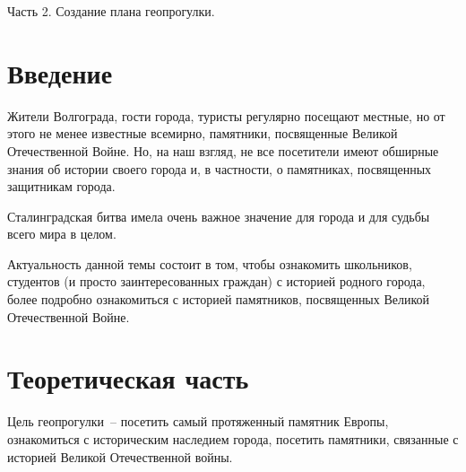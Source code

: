 \newcommand{\eX}{\stepcounter{theX}X\arabic{theX}}

\begin{center}
  \large Часть 2. Создание плана геопрогулки.
\end{center}

\section*{Введение}

Жители Волгограда, гости города, туристы регулярно посещают местные, но от этого
не менее известные всемирно, памятники, посвященные Великой Отечественной Войне.
Но, на наш взгляд, не все посетители имеют обширные знания об истории своего
города и, в частности, о памятниках, посвященных защитникам города.

Сталинградская битва имела очень важное значение для города и для судьбы всего
мира в целом.

Актуальность данной темы состоит в том, чтобы ознакомить школьников, студентов
(и просто заинтересованных граждан) с историей родного города, более подробно
ознакомиться с историей памятников, посвященных Великой Отечественной Войне.

\section*{Теоретическая часть}

Цель геопрогулки~-- посетить самый протяженный памятник Европы, ознакомиться с
историческим наследием города, посетить памятники, связанные с историей Великой
Отечественной войны.

